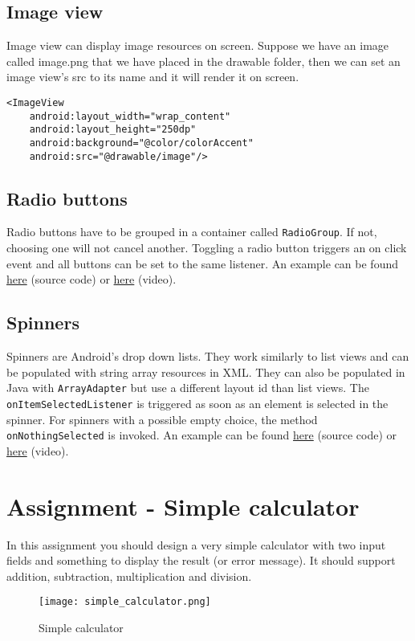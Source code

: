 \subsection{Image view}
Image view can display image resources on screen. Suppose we have an image called image.png that we have placed in the drawable folder, then we can set an image view's src to its name and it will render it on screen.
\begin{lstlisting}[style=A_XML]
<ImageView
    android:layout_width="wrap_content"
    android:layout_height="250dp"
    android:background="@color/colorAccent"
    android:src="@drawable/image"/>
\end{lstlisting}

\subsection{Radio buttons}
Radio buttons have to be grouped in a container called \texttt{RadioGroup}. If not, choosing one will not cancel another. Toggling a radio button triggers an on click event and all buttons can be set to the same listener. An example can be found \href{https://github.com/JonSteinn/AndroidDevelopment/tree/master/examples/lab1/radiobuttons}{here} (source code) or \href{https://youtu.be/KkGTWhA-I3k}{here} (video).

\subsection{Spinners}
Spinners are Android's drop down lists. They work similarly to list views and can be populated with string array resources in XML. They can also be populated in Java with \texttt{ArrayAdapter} but use a different layout id than list views. The \texttt{onItemSelectedListener} is triggered as soon as an element is selected in the spinner. For spinners with a possible empty choice, the method \texttt{onNothingSelected} is invoked. An example can be found \href{https://github.com/JonSteinn/AndroidDevelopment/tree/master/examples/lab1/spinner}{here} (source code) or \href{https://youtu.be/2itiCRTRwqY}{here} (video).

\section{Assignment - Simple calculator}
In this assignment you should design a very simple calculator with two input fields and something to display the result (or error message). It should support addition, subtraction, multiplication and division. 
\begin{figure}[H]
\centering
\texttt{[image: simple\_calculator.png]}
\caption{Simple calculator}
\label{fig:simcal}
\end{figure}
